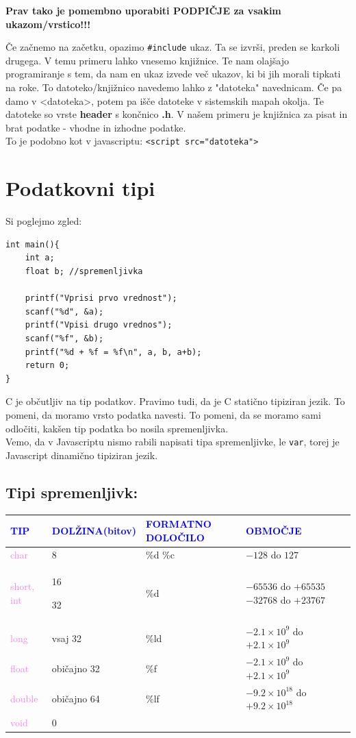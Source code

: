 \documentclass[a4paper, 12pt]{article}
\begin{document}
\textbf{Prav tako je pomembno uporabiti PODPIČJE za vsakim ukazom/vrstico!!!}

Če začnemo na začetku, opazimo \texttt{\#include} ukaz. Ta se izvrši, preden se karkoli drugega. V temu primeru lahko vnesemo knjižnice. Te nam olajšajo programiranje s tem, da nam en ukaz izvede več ukazov, ki bi jih morali tipkati na roke. To datoteko/knjižnico navedemo lahko z "datoteka" navednicam. Če pa damo v <datoteka>, potem pa išče datoteke v sistemskih mapah okolja. Te datoteke so vrste \textbf{header} s končnico \textbf{.h}. V našem primeru je knjižnica za pisat in brat podatke - vhodne in izhodne podatke.\\
To je podobno kot v javascriptu:  \lstinline|<script src="datoteka">|\ 
\section{Podatkovni tipi}
Si poglejmo zgled:
\begin{lstlisting}
int main(){
	int a;
	float b; //spremenljivka

	printf("Vprisi prvo vrednost");
	scanf("%d", &a);
	printf("Vpisi drugo vrednos");
	scanf("%f", &b);
	printf("%d + %f = %f\n", a, b, a+b);
	return 0;
}
\end{lstlisting}

C je občutljiv na tip podatkov. Pravimo tudi, da je C statično tipiziran jezik. To pomeni, da moramo vrsto podatka navesti. 
To pomeni, da se moramo sami odločiti, kakšen tip podatka bo nosila spremenljivka.\\
Vemo, da v Javascriptu nismo rabili napisati tipa spremenljivke, le \texttt{var}, torej je Javascript dinamično tipiziran jezik.

\pagebreak

\subsection*{Tipi spremenljivk:}

\begin{center}
	\begin{tabular}[b]{|p{3cm}|p{3cm}|p{3cm}|p{4.5cm}|}
		\hline \textcolor{blue}{TIP} & \textcolor{blue}{DOLŽINA(bitov)} & \textcolor{blue}{FORMATNO DOLOČILO} & \textcolor{blue}{OBMOČJE} \\ \hline\hline
		\textcolor{violet}{char} & 8 & \%d \%c& $-128$ do $127$ \\
		\textcolor{violet}{short, int} & 16\ 
		
		32  & \%d &$-65536$ do $+65535$ \ $-32768$ do $+23767$\\
		\textcolor{violet}{long} & vsaj 32 & \%ld & $-2.1\times10^9$ do $+2.1\times10^9$\\
		\textcolor{violet}{float} & običajno 32 & \%f & $-2.1\times10^9$ do $+2.1\times10^9$\\
		\textcolor{violet}{double} & običajno 64 &\%lf& $-9.2\times10^{18}$ do $+9.2\times10^{18}$ \\
		\textcolor{violet}{void} & 0 & & \\ \hline
	\end{tabular}
\end{center}
\end{document}
